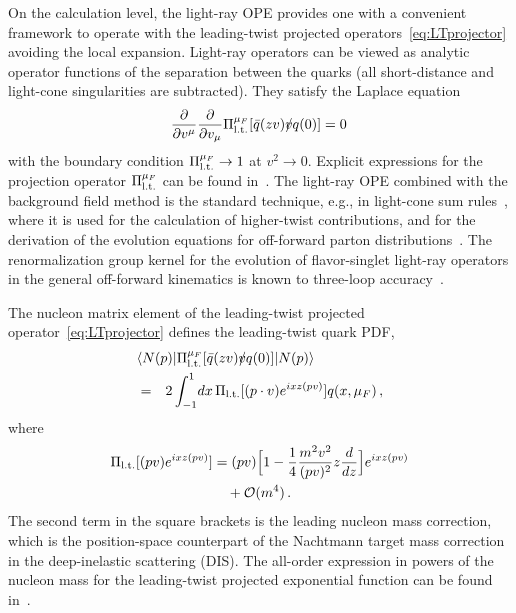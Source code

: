 On the calculation level, the light-ray OPE provides one with a convenient framework to operate with the leading-twist projected operators~\eqref{eq:LTprojector} avoiding the local expansion. Light-ray operators can be viewed as analytic operator functions of the separation 
between the quarks (all short-distance and light-cone singularities are subtracted). They satisfy the Laplace 
equation~\cite{Balitsky:1987bk}
\begin{align}
 \frac{\partial}{\partial v^\mu} \frac{\partial}{\partial v_\mu}  \Pi_{\rm l.t.}^{\mu_F}[\bar q (z v ) \slashed{v} q(0)] =0\,
\end{align}
with the boundary condition $\Pi_{\rm l.t.}^{\mu_F}\to 1 $ at $v^2 \to 0$. 
Explicit expressions for the projection operator $\Pi_{\rm l.t.}^{\mu_F}$ can be 
found in~\cite{Balitsky:1987bk,Geyer:1999uq,Geyer:2000ig,Braun:2011dg}. 
The light-ray OPE combined with the background field method is the standard technique, e.g., 
in light-cone sum rules~\cite{Balitsky:1989ry}, where it is used for the calculation of higher-twist contributions, 
and for the derivation of the evolution equations for off-forward parton distributions~\cite{Belitsky:1999hf,Belitsky:1998gc}. 
The renormalization group kernel for the evolution of flavor-singlet light-ray operators in the general off-forward kinematics 
is known to three-loop accuracy~\cite{Braun:2017cih}. 

The nucleon matrix element of the leading-twist projected operator~\eqref{eq:LTprojector} defines the leading-twist 
quark PDF,
\begin{eqnarray}
\lefteqn{ \langle N(p)| \Pi_{\rm l.t.}^{\mu_F}[\bar q (zv) \slashed{v} q(0)] |N(p)\rangle}
\notag\\ 
&=& 2 \int_{-1}^1\!dx\, \Pi_{\rm l.t.}[(p\cdot v) e^{ i x z (pv)}] q(x,\mu_F)\,, 
\end{eqnarray}
where~\cite{Balitsky:1990ck} 
\begin{align}
\label{Pi-exp}
\Pi_{\rm l.t.}[(pv) e^{ i x z(pv)}]
&= (pv)\Big[1 - \frac{1}{4} \frac{m^2 v^2}{(pv)^2} z\frac{d}{dz} \Big] e^{ ixz(pv)}
\nonumber\\&\quad
+ \mathcal{O}(m^4)\,. 
\end{align}
The second term in the square brackets is the leading nucleon mass correction,  which is the position-space counterpart of the Nachtmann target mass correction~\cite{Nachtmann:1973mr} in the deep-inelastic scattering (DIS). The all-order expression in powers of the nucleon mass for the leading-twist projected exponential function can be found in~\cite{Balitsky:1990ck}.

